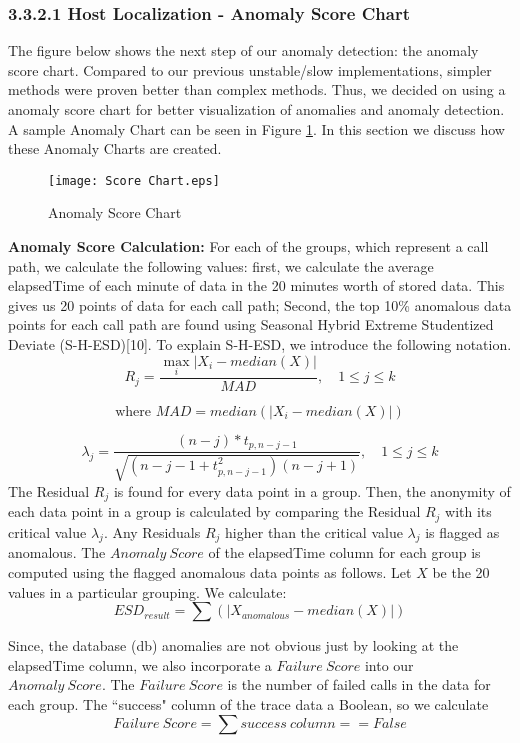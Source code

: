 \documentclass[12pt]{article}
\begin{document}
\subsubsection*{3.3.2.1 Host Localization - Anomaly Score Chart}
The figure below shows the next step of our anomaly detection: the anomaly score chart. Compared to our previous unstable/slow implementations, simpler methods were proven better than complex methods. Thus, we decided on using a anomaly score chart for better visualization of anomalies and anomaly detection. A sample Anomaly Chart can be seen in Figure \ref{fig:Anomaly Score Chart}. In this section we discuss how these Anomaly Charts are created.
\begin{figure}[H]
    \centering
    \texttt{[image: Score Chart.eps]}
    \caption{Anomaly Score Chart}
    \label{fig:Anomaly Score Chart}
\end{figure}
\noindent
\textbf{Anomaly Score Calculation:} For each of the groups, which represent a call path, we calculate the following values: first, we calculate the average elapsedTime of each minute of data in the 20 minutes worth of stored data. This gives us 20 points of data for each call path; Second, the top 10\% anomalous data points for each call path are found using Seasonal Hybrid Extreme Studentized Deviate (S-H-ESD)[10]. To explain S-H-ESD, we introduce the following notation.
\begin{equation}
    R_j = \frac{\max_i |X_i - median(X)|}{MAD}, \quad 1 \leq j \leq k
    \label{eq:esd_test}
\end{equation}

\[
    \text{where }  MAD = median(|X_i - median(X)|)
\]

\begin{equation}
    \lambda_j = \frac{(n-j) * t_{p,n-j-1}}{\sqrt{(n-j-1+t_{p,n-j-1}^2)(n-j+1)}}, \quad 1 \leq j \leq k 
    \label{eq:esd_critical}
\end{equation}
The Residual $R_j$ is found for every data point in a group. Then, the anonymity of each data point in a group is calculated by comparing the Residual $R_j$ with its critical value $\lambda_j$. Any Residuals $R_j$ higher than the critical value $\lambda_j$ is flagged as anomalous. The $Anomaly\ Score$ of the elapsedTime column for each group is computed using the flagged anomalous data points as follows. Let $X$ be the 20 values in a particular grouping. We calculate:
\[
    ESD_{result} = \sum(|X_{anomalous} - median(X)|)
\]

\noindent Since, the database (db) anomalies are not obvious just by looking at the elapsedTime column, we also incorporate a $Failure\ Score$ into our $Anomaly\ Score$. The $Failure\ Score$ is the number of failed calls in the data for each group. The ``success" column of the trace data a Boolean, so we calculate
\[
    Failure\ Score =  \sum success\ column == False
\]
\end{document}
